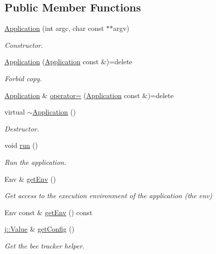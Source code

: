 \subsection*{Public Member Functions}
\begin{DoxyCompactItemize}
\item 
\hyperlink{class_application_a571b19044041fe7b63f0da45dc56532e}{Application} (int argc, char const $\ast$$\ast$argv)
\begin{DoxyCompactList}\small\item\em Constructor. \end{DoxyCompactList}\item 
\hyperlink{class_application_a045b831793669ac925c635dcb4786087}{Application} (\hyperlink{class_application}{Application} const \&)=delete
\begin{DoxyCompactList}\small\item\em Forbid copy. \end{DoxyCompactList}\item 
\hyperlink{class_application}{Application} \& \hyperlink{class_application_a1fee125c91f0e7c1fcb7a7fd4318c74e}{operator=} (\hyperlink{class_application}{Application} const \&)=delete
\item 
virtual \hyperlink{class_application_a748bca84fefb9c12661cfaa2f623748d}{$\sim$\-Application} ()
\begin{DoxyCompactList}\small\item\em Destructor. \end{DoxyCompactList}\item 
void \hyperlink{class_application_a68965449404743bf1add056784d6cf81}{run} ()
\begin{DoxyCompactList}\small\item\em Run the application. \end{DoxyCompactList}\item 
Env \& \hyperlink{class_application_a66c2e8b7340252006680158876db46e1}{get\-Env} ()
\begin{DoxyCompactList}\small\item\em Get access to the execution environment of the application (the env) \end{DoxyCompactList}\item 
Env const \& \hyperlink{class_application_a88fc89d94da74af06091464e1dfe4a8f}{get\-Env} () const 
\item 
\hyperlink{classj_1_1_value}{j\-::\-Value} \& \hyperlink{class_application_a40ada3828cedc56606182850eb1ea267}{get\-Config} ()
\begin{DoxyCompactList}\small\item\em Get the bee tracker helper. \end{DoxyCompactList}\item 
$$
\end{DoxyCompactItemize}
